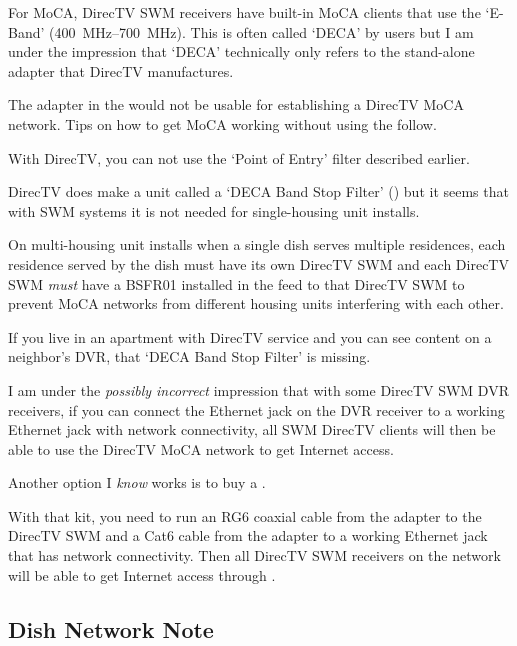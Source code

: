 For MoCA, DirecTV SWM receivers have built-in MoCA clients that use the `E-Band' (\qtyrange{400}{700}{\mega\hertz}).
This is often called `DECA' by users but I am under the impression that `DECA' technically only refers to the
stand-alone \eband{} adapter that DirecTV manufactures.

The \xdband{} adapter in the  would not be usable for establishing a DirecTV MoCA
network. Tips on how to get MoCA working without using the  follow.

With DirecTV, you can not use the `Point of Entry' filter described earlier.

DirecTV does make a unit called a `DECA Band Stop Filter'
()
but it seems that with SWM systems it is not needed for single-housing unit installs.

On multi-housing unit installs when a single dish serves multiple residences, each residence served by
the dish must have its own DirecTV SWM  and each DirecTV SWM
 \emph{must} have a BSFR01 installed in the feed to that DirecTV SWM
 to prevent MoCA networks from different housing units interfering with
each other.

If you live in an apartment with DirecTV service and you can see content on a neighbor's DVR, that `DECA
Band Stop Filter' is missing.

I am under the \emph{possibly incorrect} impression that with some DirecTV SWM DVR receivers, if you can
connect the Ethernet jack on the DVR receiver to a working Ethernet jack with network connectivity,
all SWM DirecTV clients will then be able to use the DirecTV MoCA network to get Internet access.

Another option I \emph{know} works is to buy a
.

With that kit, you need to run an RG6 coaxial cable from the adapter to the DirecTV SWM 
and a Cat6 cable from the adapter to a working Ethernet jack that has network connectivity. Then
all DirecTV SWM receivers on the network will be able to get Internet access through \eband{}.

\subsection{Dish Network Note}

